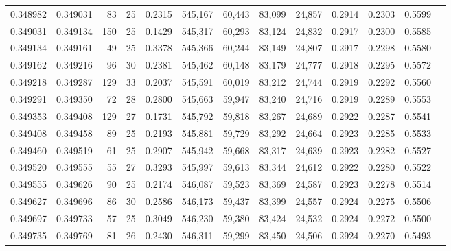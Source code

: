 \begin{tabular}{rrrrrrrrrrrrr}
0.348982 & 0.349031 &    83 &  25 &                                     0.2315 & 545,167 &  60,443 &  83,099 &  24,857 & 0.2914 & 0.2303 & 0.5599 \\
0.349031 & 0.349134 &   150 &  25 &                                     0.1429 & 545,317 &  60,293 &  83,124 &  24,832 & 0.2917 & 0.2300 & 0.5585 \\
0.349134 & 0.349161 &    49 &  25 &                                     0.3378 & 545,366 &  60,244 &  83,149 &  24,807 & 0.2917 & 0.2298 & 0.5580 \\
0.349162 & 0.349216 &    96 &  30 &                                     0.2381 & 545,462 &  60,148 &  83,179 &  24,777 & 0.2918 & 0.2295 & 0.5572 \\
0.349218 & 0.349287 &   129 &  33 &                                     0.2037 & 545,591 &  60,019 &  83,212 &  24,744 & 0.2919 & 0.2292 & 0.5560 \\
0.349291 & 0.349350 &    72 &  28 &                                     0.2800 & 545,663 &  59,947 &  83,240 &  24,716 & 0.2919 & 0.2289 & 0.5553 \\
0.349353 & 0.349408 &   129 &  27 &                                     0.1731 & 545,792 &  59,818 &  83,267 &  24,689 & 0.2922 & 0.2287 & 0.5541 \\
0.349408 & 0.349458 &    89 &  25 &                                     0.2193 & 545,881 &  59,729 &  83,292 &  24,664 & 0.2923 & 0.2285 & 0.5533 \\
0.349460 & 0.349519 &    61 &  25 &                                     0.2907 & 545,942 &  59,668 &  83,317 &  24,639 & 0.2923 & 0.2282 & 0.5527 \\
0.349520 & 0.349555 &    55 &  27 &                                     0.3293 & 545,997 &  59,613 &  83,344 &  24,612 & 0.2922 & 0.2280 & 0.5522 \\
0.349555 & 0.349626 &    90 &  25 &                                     0.2174 & 546,087 &  59,523 &  83,369 &  24,587 & 0.2923 & 0.2278 & 0.5514 \\
0.349627 & 0.349696 &    86 &  30 &                                     0.2586 & 546,173 &  59,437 &  83,399 &  24,557 & 0.2924 & 0.2275 & 0.5506 \\
0.349697 & 0.349733 &    57 &  25 &                                     0.3049 & 546,230 &  59,380 &  83,424 &  24,532 & 0.2924 & 0.2272 & 0.5500 \\
0.349735 & 0.349769 &    81 &  26 &                                     0.2430 & 546,311 &  59,299 &  83,450 &  24,506 & 0.2924 & 0.2270 & 0.5493 \\

\end{tabular}
